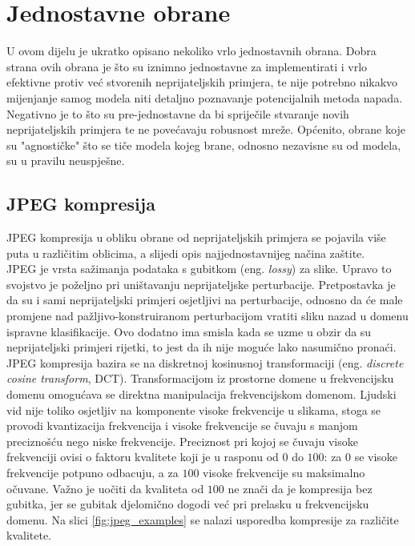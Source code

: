 \documentclass[utf8, diplomski]{fer}
\begin{document}
\section{Jednostavne obrane}
U ovom dijelu je ukratko opisano nekoliko vrlo jednostavnih obrana. Dobra strana ovih obrana je što su iznimno jednostavne za implementirati i vrlo efektivne protiv već stvorenih neprijateljskih primjera, te nije potrebno nikakvo mijenjanje samog modela niti detaljno poznavanje potencijalnih metoda napada. Negativno je to što su pre-jednostavne da bi spriječile stvaranje novih neprijateljskih primjera te ne povećavaju robusnost mreže. Općenito, obrane koje su "agnostičke" što se tiče modela kojeg brane, odnosno nezavisne su od modela, su u pravilu neuspješne.
\subsection{JPEG kompresija}\label{jpeg_comp}
JPEG kompresija u obliku obrane od neprijateljskih primjera se pojavila više puta u različitim oblicima\citep{jpeg1}\citep{jpeg2}\citep{jpeg3}, a slijedi opis najjednostavnijeg načina zaštite. \\
JPEG je vrsta sažimanja podataka s gubitkom (eng. \textit{lossy}) za slike. Upravo to svojstvo je poželjno pri uništavanju neprijateljske perturbacije. Pretpostavka je da su i sami neprijateljski primjeri osjetljivi na perturbacije, odnosno da će male promjene nad pažljivo-konstruiranom perturbacijom vratiti sliku nazad u domenu ispravne klasifikacije. Ovo dodatno ima smisla kada se uzme u obzir da su neprijateljski primjeri rijetki, to jest da ih nije moguće lako nasumično pronaći. \\
JPEG kompresija bazira se na diskretnoj kosinusnoj transformaciji (eng. \textit{discrete cosine transform}, DCT). Transformacijom iz prostorne domene u frekvencijsku domenu omogućava se direktna manipulacija frekvencijskom domenom. Ljudski vid nije toliko osjetljiv na komponente visoke frekvencije u slikama, stoga se provodi kvantizacija frekvencija i visoke frekvencije se čuvaju s manjom preciznošću nego niske frekvencije. Preciznost pri kojoj se čuvaju visoke frekvenciji ovisi o faktoru kvalitete koji je u rasponu od $0$ do $100$: za $0$ se visoke frekvencije potpuno odbacuju, a za $100$ visoke frekvencije su maksimalno očuvane. Važno je uočiti da kvaliteta od $100$ ne znači da je kompresija bez gubitka, jer se gubitak djelomično dogodi već pri prelasku u frekvencijsku domenu. Na slici \ref{fig:jpeg_examples} se nalazi usporedba kompresije za različite kvalitete.
\end{document}
